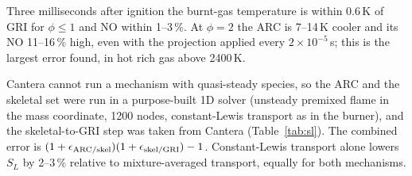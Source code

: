 \documentclass[preprint,review,12pt]{elsarticle}
\begin{document}
\begin{table}[t]
\centering\small
\caption{Ignition delay, independent rebuild: errors against GRI-Mech~3.0 for $\phi=0.5$\,/\,1.0\,/\,2.0.}
\label{tab:ign}
\end{table}

Three milliseconds after ignition the burnt-gas temperature is within 0.6\,K of GRI for $\phi\le1$ and NO within
1--3\,\%. At $\phi=2$ the ARC is 7--14\,K cooler and its NO 11--16\,\% high, even with the projection applied every
$2\times10^{-5}$\,s; this is the largest error found, in hot rich gas above 2400\,K.

Cantera cannot run a mechanism with quasi-steady species, so the ARC and the skeletal set were run in a purpose-built
1D solver (unsteady premixed flame in the mass coordinate, 1200 nodes, constant-Lewis transport as in the burner), and
the skeletal-to-GRI step was taken from Cantera (Table~\ref{tab:sl}). The combined error is
$(1+\epsilon_{\rm ARC/skel})(1+\epsilon_{\rm skel/GRI})-1$. Constant-Lewis transport alone lowers $S_L$ by 2--3\,\%
relative to mixture-averaged transport, equally for both mechanisms.

\begin{table}[t]
\centering\small
\caption{Laminar flame speed at 1\,atm, $T_u=300$\,K, independent rebuild.}
\label{tab:sl}
\end{table}
\end{document}
